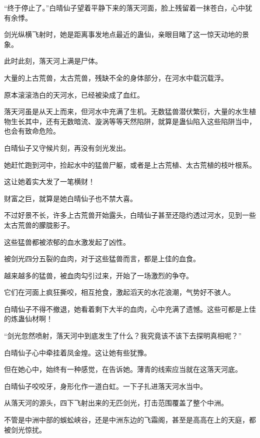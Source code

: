 
\begin{this_body}



“终于停止了。”白晴仙子望着平静下来的落天河面，脸上残留着一抹苍白，心中犹有余悸。

剑光纵横飞射时，她是距离事发地点最近的蛊仙，亲眼目睹了这一惊天动地的景象。

此时此刻，落天河上满是尸体。

大量的上古荒兽，太古荒兽，残缺不全的身体部分，在河水中载沉载浮。

原本滚滚浩白的天河水，已经被染成了血红。

落天河虽是从天上而来，但河水中充满了生机。无数猛兽潜伏繁衍，大量的水生植物生长其中，还有无数暗流、漩涡等等天然陷阱，就算是蛊仙陷入这些陷阱当中，也会有致命危险。

白晴仙子又守候片刻，再没有剑光发出。

她赶忙跑到河中，捡起水中的猛兽尸躯，或者是上古荒植、太古荒植的枝叶根系。

这让她着实大发了一笔横财！

财富之巨，就算是她白晴仙子也不禁大喜。

不过好景不长，许多上古荒兽开始露头，白晴仙子甚至还隐约透过河水，见到一些太古荒兽的朦胧影子。

这些猛兽都被浓郁的血水激发起了凶性。

被剑光四分五裂的血肉，对于这些猛兽而言，都是上佳的血食。

越来越多的猛兽，被血肉勾引过来，开始了一场激烈的争夺。

它们在河面上疯狂撕咬，相互抢食，激起滔天的水花浪潮，气势好不骇人。

白晴仙子不得不撤退，她看着剩下大半的血肉，心中充满了遗憾。这些可都是上佳的炼蛊仙材啊！

“剑光忽然喷射，落天河中到底发生了什么？我究竟该不该下去探明真相呢？”

白晴仙子心中牵挂着凤金煌。这让她有些犹豫。

但在她心中，始终有一种感觉，在告诉她。薄青的线索应当就在这落天河底。

白晴仙子咬咬牙，身形化作一道白虹。一下子扎进落天河水当中。

从落天河的源头，四下飞射出来的无匹剑光，打击范围覆盖了整个中洲。

不管是中洲中部的蜈蚣峡谷，还是中洲东边的飞霜阁，甚至是高高在上的天庭，都被剑光惊扰。


\end{this_body}
